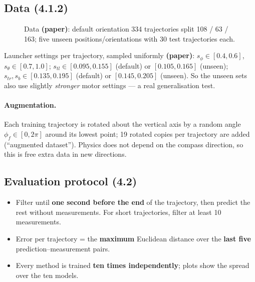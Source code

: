 \documentclass[11pt,a4paper]{article}
\begin{document}
\subsection{Data (4.1.2)}
\begin{figure}[htbp]
\centering
{}
\caption{Data \textbf{(paper)}: default orientation 334 trajectories split 108 / 63 / 163; five unseen positions/orientations with 30 test trajectories each.}
\end{figure}
Launcher settings per trajectory, sampled uniformly \textbf{(paper)}: $s_\phi\in[0.4,0.6]$, $s_\theta\in[0.7,1.0]$; $s_{tl}\in[0.095,0.155]$ (default) or $[0.105,0.165]$ (unseen);
$s_{tr},s_b\in[0.135,0.195]$ (default) or $[0.145,0.205]$ (unseen). So the unseen sets also use slightly \emph{stronger} motor settings --- a real generalisation test.

\paragraph{Augmentation.} Each training trajectory is rotated about the vertical axis by a random angle $\phi_f\in[0,2\pi]$ around its lowest point; 19 rotated copies per trajectory are added (``augmented dataset'').
Physics does not depend on the compass direction, so this is free extra data in new directions.

\subsection{Evaluation protocol (4.2)}
\begin{itemize}
\item Filter until \textbf{one second before the end} of the trajectory, then predict the rest without measurements. For short trajectories, filter at least 10 measurements.
\item Error per trajectory = the \textbf{maximum} Euclidean distance over the \textbf{last five} prediction--measurement pairs.
\item Every method is trained \textbf{ten times independently}; plots show the spread over the ten models.
\end{itemize}
\end{document}
